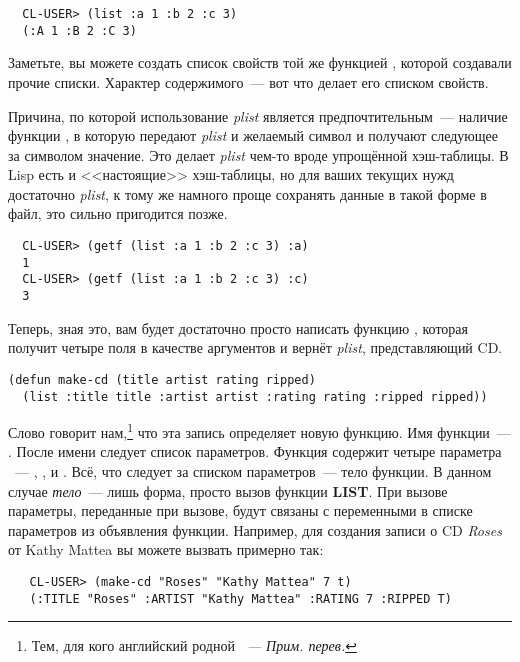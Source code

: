 \begin{verbatim}
  CL-USER> (list :a 1 :b 2 :c 3)
  (:A 1 :B 2 :C 3)
\end{verbatim}

Заметьте, вы можете создать список свойств той же функцией , которой создавали
прочие списки. Характер содержимого~--- вот что делает его списком свойств.

Причина, по которой использование \textit{plist} является предпочтительным~--- наличие
функции , в которую передают \textit{plist} и желаемый символ и получают
следующее за символом значение. Это делает \textit{plist} чем-то вроде упрощённой
хэш-таблицы. В Lisp есть и <<настоящие>> хэш-таблицы, но для ваших текущих нужд достаточно
\textit{plist}, к тому же намного проще сохранять данные в такой форме в файл, это сильно
пригодится позже.

\begin{verbatim}
  CL-USER> (getf (list :a 1 :b 2 :c 3) :a)
  1
  CL-USER> (getf (list :a 1 :b 2 :c 3) :c)
  3
\end{verbatim}

Теперь, зная это, вам будет достаточно просто написать функцию , которая
получит четыре поля в качестве аргументов и вернёт \textit{plist}, представляющий CD.

\begin{lstlisting}
(defun make-cd (title artist rating ripped)
  (list :title title :artist artist :rating rating :ripped ripped))
\end{lstlisting}

Слово  говорит нам,\footnote{Тем, для кого английский родной \textit{~---
Прим. перев.}} что эта запись определяет новую функцию. Имя функции~---
. После имени следует список параметров. Функция содержит четыре параметра
~--- , ,  и . Всё, что следует за
списком параметров~--- тело функции. В данном случае \textit{тело}~--- лишь форма, просто
вызов функции \textbf{LIST}. При вызове  параметры, переданные при вызове,
будут связаны с переменными в списке параметров из объявления функции. Например, для
создания записи о CD \textit{Roses} от Kathy Mattea вы можете вызвать 
примерно так:

\begin{verbatim}
   CL-USER> (make-cd "Roses" "Kathy Mattea" 7 t)
   (:TITLE "Roses" :ARTIST "Kathy Mattea" :RATING 7 :RIPPED T) 
\end{verbatim}


